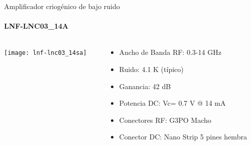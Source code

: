 \documentclass[ignorenonframetext,12pt]{beamer}
\begin{document}
				\begin{frame}{Amplificador criog\'enico de bajo ruido}
								\framesubtitle{LNF-LNC03\_14A}
								\begin{columns}
												\begin{column}{0.40\textwidth}
				\hspace{10mm}\texttt{[image: lnf-lnc03\_14sa]}
												\end{column}
												\begin{column}{0.60\textwidth}
																\begin{itemize}
																				\item Ancho de Banda RF: 0.3-14 GHz
																				\item Ruido: 4.1 K (típico)
																				\item Ganancia: 42 dB
																				\item Potencia DC: Vc= 0.7 V @ 14 mA
																				\item Conectores RF: G3PO Macho
																				\item Conector DC: Nano Strip 5 pines hembra
																\end{itemize}
												\end{column}
								\end{columns}
				\end{frame}
\end{document}
